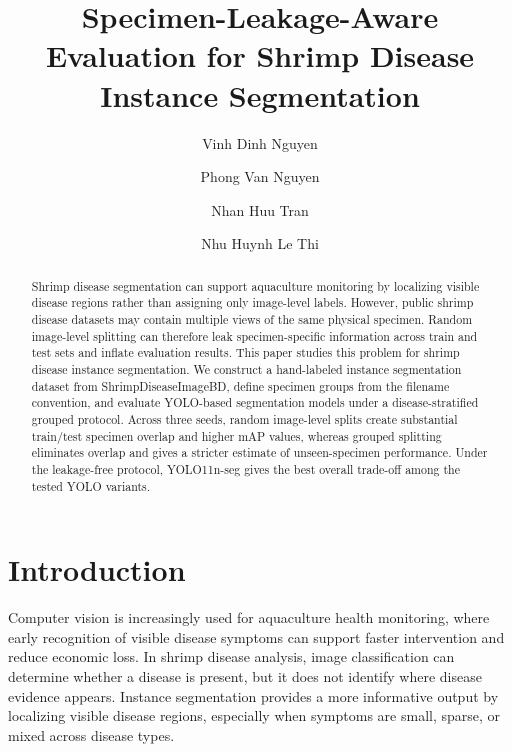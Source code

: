 \documentclass{svproc}
\begin{document}
\mainmatter

\title{Specimen-Leakage-Aware Evaluation for Shrimp Disease Instance Segmentation}


\author{
Vinh Dinh Nguyen
\and
Phong Van Nguyen
\and
Nhan Huu Tran
\and
Nhu Huynh Le Thi
}




\maketitle

\begin{abstract}
Shrimp disease segmentation can support aquaculture monitoring by localizing visible disease regions rather than assigning only image-level labels. However, public shrimp disease datasets may contain multiple views of the same physical specimen. Random image-level splitting can therefore leak specimen-specific information across train and test sets and inflate evaluation results. This paper studies this problem for shrimp disease instance segmentation. We construct a hand-labeled instance segmentation dataset from ShrimpDiseaseImageBD, define specimen groups from the filename convention, and evaluate YOLO-based segmentation models under a disease-stratified grouped protocol. Across three seeds, random image-level splits create substantial train/test specimen overlap and higher mAP values, whereas grouped splitting eliminates overlap and gives a stricter estimate of unseen-specimen performance. Under the leakage-free protocol, YOLO11n-seg gives the best overall trade-off among the tested YOLO variants.
\end{abstract}

\section{Introduction}

Computer vision is increasingly used for aquaculture health monitoring, where early recognition of visible disease symptoms can support faster intervention and reduce economic loss. In shrimp disease analysis, image classification can determine whether a disease is present, but it does not identify where disease evidence appears. Instance segmentation provides a more informative output by localizing visible disease regions, especially when symptoms are small, sparse, or mixed across disease types.
\end{document}
